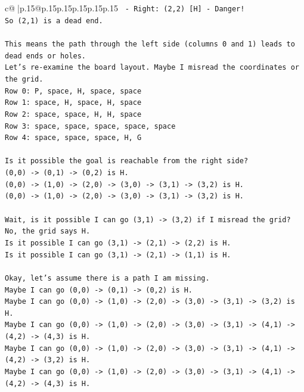 \documentclass{article}
\begin{document}
{\begin{supertabular}{c@{$\;$}|p{.15\linewidth}@{}p{.15\linewidth}p{.15\linewidth}p{.15\linewidth}p{.15\linewidth}p{.15\linewidth}}
{{{\texttt{  {-} Right: (2,2) {[}H{]} {-} Danger!} \\
\texttt{So (2,1) is a dead end.} \\
\\ 
\texttt{This means the path through the left side (columns 0 and 1) leads to dead ends or holes.} \\
\texttt{Let's re{-}examine the board layout. Maybe I misread the coordinates or the grid.} \\
\texttt{Row 0: P, space, H, space, space} \\
\texttt{Row 1: space, H, space, H, space} \\
\texttt{Row 2: space, space, H, H, space} \\
\texttt{Row 3: space, space, space, space, space} \\
\texttt{Row 4: space, space, space, H, G} \\
\\ 
\texttt{Is it possible the goal is reachable from the right side?} \\
\texttt{(0,0) {-}> (0,1) {-}> (0,2) is H.} \\
\texttt{(0,0) {-}> (1,0) {-}> (2,0) {-}> (3,0) {-}> (3,1) {-}> (3,2) is H.} \\
\texttt{(0,0) {-}> (1,0) {-}> (2,0) {-}> (3,0) {-}> (3,1) {-}> (3,2) is H.} \\
\\ 
\texttt{Wait, is it possible I can go (3,1) {-}> (3,2) if I misread the grid? No, the grid says H.} \\
\texttt{Is it possible I can go (3,1) {-}> (2,1) {-}> (2,2) is H.} \\
\texttt{Is it possible I can go (3,1) {-}> (2,1) {-}> (1,1) is H.} \\
\\ 
\texttt{Okay, let's assume there is a path I am missing.} \\
\texttt{Maybe I can go (0,0) {-}> (0,1) {-}> (0,2) is H.} \\
\texttt{Maybe I can go (0,0) {-}> (1,0) {-}> (2,0) {-}> (3,0) {-}> (3,1) {-}> (3,2) is H.} \\
\texttt{Maybe I can go (0,0) {-}> (1,0) {-}> (2,0) {-}> (3,0) {-}> (3,1) {-}> (4,1) {-}> (4,2) {-}> (4,3) is H.} \\
\texttt{Maybe I can go (0,0) {-}> (1,0) {-}> (2,0) {-}> (3,0) {-}> (3,1) {-}> (4,1) {-}> (4,2) {-}> (3,2) is H.} \\
\texttt{Maybe I can go (0,0) {-}> (1,0) {-}> (2,0) {-}> (3,0) {-}> (3,1) {-}> (4,1) {-}> (4,2) {-}> (4,3) is H.} \\
}}}
\end{supertabular}}
\end{document}
